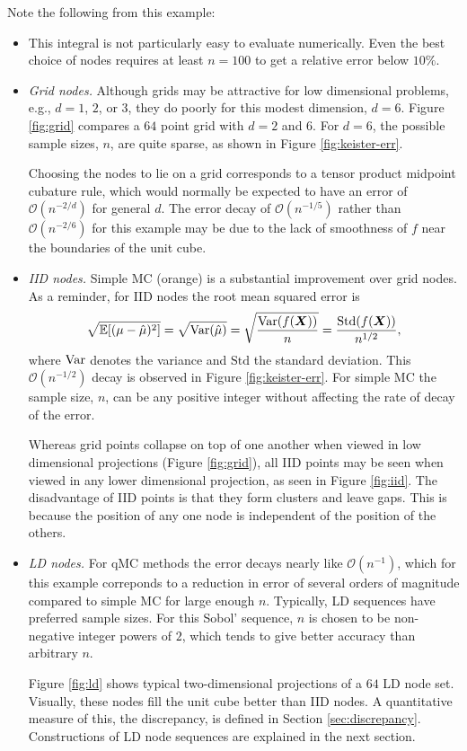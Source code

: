 \documentclass{svproc}
\begin{document}
Note the following from this example:
\begin{itemize}
	\item This integral is not particularly easy to evaluate numerically.  Even the best choice of nodes requires at least $n=100$ to get a relative error below $10\%$.

	\item \emph{Grid nodes.} Although grids may be attractive for low dimensional problems, e.g., $d = 1$, $2$, or $3$, they do poorly for this modest dimension, $d=6$.  Figure \ref{fig:grid} compares a $64$ point grid with $d = 2$ and $6$.  For $d = 6$, the possible sample sizes, $n$, are quite sparse, as shown in Figure \ref{fig:keister-err}.

	Choosing the nodes to lie on a grid corresponds to a tensor product midpoint cubature rule, which would normally be expected to have an error of $\mathcal{O}(n^{-2/d})$  for general $d$.  The error decay of $\mathcal{O}(n^{-1/5})$ rather than $\mathcal{O}(n^{-2/6})$ for this example may be due to the lack of smoothness of $f$ near the boundaries of the unit cube.

	\item \emph{IID nodes.}  Simple MC (orange) is a substantial improvement over grid nodes. As a reminder, for IID nodes the root mean squared error is
	\begin{equation}\label{eq:IIDerror}
		\sqrt{\mathbb{E}[(\mu - \hat{\mu})^2]} = \sqrt{\operatorname{Var}(\hat{\mu})} = \sqrt{\frac{\operatorname{Var}(f({\boldsymbol{X}}))}{n}} = \frac{\mathrm{Std}(f({\boldsymbol{X}}))}{n^{1/2}},
	\end{equation}
	where $\operatorname{Var}$ denotes the variance and $\mathrm{Std}$ the standard deviation.  This $\mathcal{O}(n^{-1/2})$ decay is observed in Figure \ref{fig:keister-err}. For simple MC the sample size, $n$, can be any positive integer without affecting the rate of decay of the error.

	Whereas grid points collapse on top of one another when viewed in low dimensional projections (Figure \ref{fig:grid}), all IID points may be seen when viewed in any lower dimensional projection, as seen in Figure \ref{fig:iid}.  The disadvantage of IID points is that they form clusters and leave gaps.  This is because the position of any one node is independent of the position of the others.

	\item \emph{LD nodes.}  For qMC methods the error decays nearly like $\mathcal{O}(n^{-1})$, which for this example correponds to a reduction in error of several orders of magnitude compared to simple MC for large enough $n$.  Typically, LD sequences have preferred sample sizes.  For this Sobol' sequence, $n$ is chosen to be non-negative integer powers of $2$, which tends to give better accuracy than arbitrary $n$.

	Figure \ref{fig:ld} shows typical two-dimensional projections of a $64$ LD node set.  Visually, these nodes fill the unit cube better than IID nodes.  A quantitative measure of this, the discrepancy, is defined in Section \ref{sec:discrepancy}.  Constructions of LD node sequences are explained in the next section.

\end{itemize}
\end{document}
